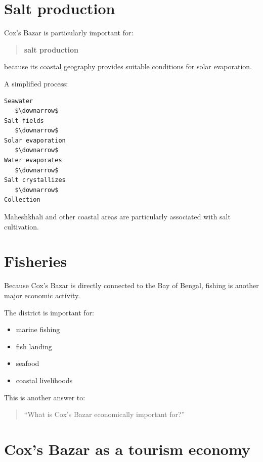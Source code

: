 \medskip

\section{Salt production}

Cox's Bazar is particularly important for:

\begin{quote}
\textbf{salt production}\\
\end{quote}

because its coastal geography provides suitable conditions for solar evaporation.

A simplified process:

\begin{lstlisting}
Seawater
   $\downarrow$
Salt fields
   $\downarrow$
Solar evaporation
   $\downarrow$
Water evaporates
   $\downarrow$
Salt crystallizes
   $\downarrow$
Collection
\end{lstlisting}

Maheshkhali and other coastal areas are particularly associated with salt cultivation.

\medskip

\section{Fisheries}

Because Cox's Bazar is directly connected to the Bay of Bengal, fishing is another major economic activity.

The district is important for:

\begin{itemize}
  \item marine fishing
  \item fish landing
  \item seafood
  \item coastal livelihoods
\end{itemize}

This is another answer to:

\begin{quote}
``What is Cox's Bazar economically important for?''\\
\end{quote}

\medskip

\section{Cox's Bazar as a tourism economy}

